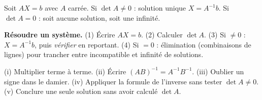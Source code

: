 \begin{propriete}
Soit $AX=b$ avec $A$ carrée. Si $\det A\ne0$ : solution unique $X=A^{-1}b$. Si $\det A=0$ : soit aucune solution, soit une infinité.
\end{propriete}
\begin{methode}
\textbf{Résoudre un système.} (1) Écrire $AX=b$. (2) Calculer $\det A$. (3) Si $\ne0$ : $X=A^{-1}b$, puis \emph{vérifier} en reportant. (4) Si $=0$ : élimination (combinaisons de lignes) pour trancher entre incompatible et infinité de solutions.
\end{methode}
\begin{piege}
(i) Multiplier terme à terme. (ii) Écrire $(AB)^{-1}=A^{-1}B^{-1}$. (iii) Oublier un signe dans le damier. (iv) Appliquer la formule de l'inverse sans tester $\det A\ne0$. (v) Conclure \og une seule solution \fg{} sans avoir calculé $\det A$.
\end{piege}

